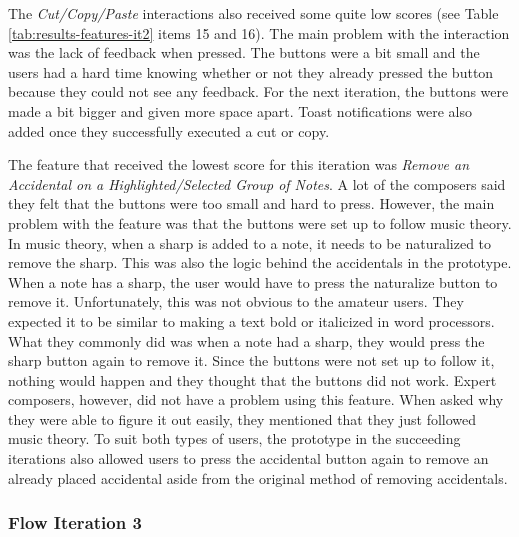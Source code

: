 
				The \textit{Cut/Copy/Paste} interactions also received some quite low scores (see Table \ref{tab:results-features-it2} items 15 and 16). The main problem with the interaction was the lack of feedback when pressed. The buttons were a bit small and the users had a hard time knowing whether or not they already pressed the button because they could not see any feedback. For the next iteration, the buttons were made a bit bigger and given more space apart. Toast notifications were also added once they successfully executed a cut or copy. 

				The feature that received the lowest score for this iteration was \textit{Remove an Accidental on a Highlighted/Selected Group of Notes}. A lot of the composers said they felt that the buttons were too small and hard to press. However, the main problem with the feature was that the buttons were set up to follow music theory. In music theory, when a sharp is added to a note, it needs to be naturalized to remove the sharp. This was also the logic behind the accidentals in the prototype. When a note has a sharp, the user would have to press the naturalize button to remove it. Unfortunately, this was not obvious to the amateur users. They expected it to be similar to making a text bold or italicized in word processors. What they commonly did was when a note had a sharp, they would press the sharp button again to remove it. Since the buttons were not set up to follow it, nothing would happen and they thought that the buttons did not work. Expert composers, however, did not have a problem using this feature. When asked why they were able to figure it out easily, they mentioned that they just followed music theory. To suit both types of users, the prototype in the succeeding iterations also allowed users to press the accidental button again to remove an already placed accidental aside from the original method of removing accidentals.

			\subsubsection{Flow Iteration 3} %
			\label{sub:iteration_3}
			
